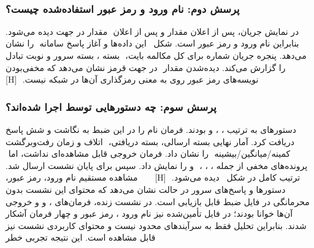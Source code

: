 ‫
‫
‫
‫
‫\subsubsection{پرسش دوم: نام ورود و رمز عبور استفاده‌شده چیست؟}
‫
‫در نمایش  جریان، پس از اعلان  مقدار  و پس از اعلان
‫ مقدار  در جهت  دیده می‌شود. بنابراین نام ورود  و رمز
‫عبور  است. شکل~ این داده‌ها و آغاز پاسخ سامانه
‫ را نشان می‌دهد. پنجره جریان شماره  برای کل مکالمه  بایت،
‫ بسته ،  بسته سرور و  نوبت تبادل را گزارش می‌کند. دیده‌شدن مقدار
‫ در جهت قرمز نشان می‌دهد که مخفی‌بودن نویسه‌های رمز عبور روی  به معنی رمزگذاری
‫آن‌ها در شبکه نیست.
‫
‫[H]
‫
‫
‫
‫
‫
‫\subsubsection{پرسش سوم: چه دستورهایی توسط  اجرا شده‌اند؟}
‫
‫دستورهای  به ترتیب ، ،  و 
‫بودند. فرمان  نام  را در این ضبط به  نگاشت و
‫شش پاسخ  دریافت کرد. آمار نهایی  بسته ارسالی،  بسته دریافتی،
‫ اتلاف و زمان رفت‌وبرگشت کمینه/میانگین/بیشینه
‫ را نشان داد. فرمان  خروجی قابل مشاهده‌ای نداشت، اما
‫ پرونده‌های مخفی از جمله ، ، ،
‫ و  را نمایش داد. سپس  برای پایان نشست ارسال شد. ترتیب کامل
‫در شکل~ دیده می‌شود.
‫
‫[H]
‫
‫
‫
‫
‫
‫مشاهده مستقیم نام ورود، رمز عبور، دستورها و پاسخ‌های سرور در حالت  نشان می‌دهد که
‫محتوای این نشست بدون محرمانگی در فایل ضبط قابل بازیابی است. در نشست زنده، فرمان‌های
‫،  و  و خروجی آن‌ها خوانا بودند؛ در فایل تأمین‌شده نیز نام ورود
‫، رمز عبور  و چهار فرمان  آشکار شدند. بنابراین تحلیل فقط به
‫سرآیندهای  محدود نیست و محتوای کاربردی نشست نیز قابل مشاهده است. این نتیجه تجربی خطر
